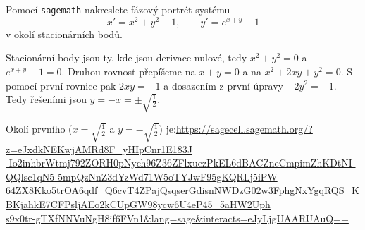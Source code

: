 \documentclass[12pt]{article}					%
\begin{document}
\begin{priklad}
	Pomocí \verb|sagemath| nakreslete fázový portrét systému
	$$ x' = x^2 + y^2 - 1, \qquad y' = e^{x + y} - 1 $$
	v okolí stacionárních bodů.

	\begin{reseni}
		Stacionární body jsou ty, kde jsou derivace nulové, tedy $x^2 + y^2 = 0$ a $e^{x + y} - 1 = 0$. Druhou rovnost přepíšeme na $x + y = 0$ a na $x^2 + 2xy + y^2 = 0$. S pomocí první rovnice pak $2xy = -1$ a dosazením z první úpravy $-2y^2 = -1$. Tedy řešeními jsou $y = -x = ±\sqrt{\frac{1}{2}}$.

		Okolí prvního ($x = \sqrt{\frac{1}{2}}$ a $y = -\sqrt{\frac{1}{2}}$) je:{\tiny \href{https://sagecell.sagemath.org/?z=eJxdkNEKwjAMRd8F_yHIpCnr1E183J-Io2inhbrWtmj792ZORH0pNych96Z36ZFlxuezPkEL6dBACZneCmpimZhKDtNI-QQlsc1qN5-5mpQzNnZ3dYzWd71W5oTYJwF95gKQRLj5iPW64ZX8Kko5trOA6qdf_Q6cvT4ZPajQsqserGdisnNWDzG02w3FphgNxYgqRQS_KBKjahkE7CFPsljAEo2kCUpGW98ycw6U4eP45_5aHW2Uphs9x0tr-gTXfNNVuNgH8if6FVn1&lang=sage&interacts=eJyLjgUAARUAuQ==}{https://sagecell.sagemath.org/?z=eJxdkNEKwjAMRd8F\_yHIpCnr1E183J}}\\
		{\tiny \href{https://sagecell.sagemath.org/?z=eJxdkNEKwjAMRd8F_yHIpCnr1E183J-Io2inhbrWtmj792ZORH0pNych96Z36ZFlxuezPkEL6dBACZneCmpimZhKDtNI-QQlsc1qN5-5mpQzNnZ3dYzWd71W5oTYJwF95gKQRLj5iPW64ZX8Kko5trOA6qdf_Q6cvT4ZPajQsqserGdisnNWDzG02w3FphgNxYgqRQS_KBKjahkE7CFPsljAEo2kCUpGW98ycw6U4eP45_5aHW2Uphs9x0tr-gTXfNNVuNgH8if6FVn1&lang=sage&interacts=eJyLjgUAARUAuQ==}{-Io2inhbrWtmj792ZORH0pNych96Z36ZFlxuezPkEL6dBACZneCmpimZhKDtNI-QQlsc1qN5-5mpQzNnZ3dYzWd71W5oTYJwF95gKQRLj5iPW}}\\
		{\tiny \href{https://sagecell.sagemath.org/?z=eJxdkNEKwjAMRd8F_yHIpCnr1E183J-Io2inhbrWtmj792ZORH0pNych96Z36ZFlxuezPkEL6dBACZneCmpimZhKDtNI-QQlsc1qN5-5mpQzNnZ3dYzWd71W5oTYJwF95gKQRLj5iPW64ZX8Kko5trOA6qdf_Q6cvT4ZPajQsqserGdisnNWDzG02w3FphgNxYgqRQS_KBKjahkE7CFPsljAEo2kCUpGW98ycw6U4eP45_5aHW2Uphs9x0tr-gTXfNNVuNgH8if6FVn1&lang=sage&interacts=eJyLjgUAARUAuQ==}{64ZX8Kko5trOA6qdf\_Q6cvT4ZPajQsqserGdisnNWDzG02w3FphgNxYgqRQS\_KBKjahkE7CFPsljAEo2kCUpGW98ycw6U4eP45\_5aHW2Uph}}\\
		{\tiny \href{https://sagecell.sagemath.org/?z=eJxdkNEKwjAMRd8F_yHIpCnr1E183J-Io2inhbrWtmj792ZORH0pNych96Z36ZFlxuezPkEL6dBACZneCmpimZhKDtNI-QQlsc1qN5-5mpQzNnZ3dYzWd71W5oTYJwF95gKQRLj5iPW64ZX8Kko5trOA6qdf_Q6cvT4ZPajQsqserGdisnNWDzG02w3FphgNxYgqRQS_KBKjahkE7CFPsljAEo2kCUpGW98ycw6U4eP45_5aHW2Uphs9x0tr-gTXfNNVuNgH8if6FVn1&lang=sage&interacts=eJyLjgUAARUAuQ==}{s9x0tr-gTXfNNVuNgH8if6FVn1\&lang=sage\&interacts=eJyLjgUAARUAuQ==}}\\[-2em]


\end{reseni}
\end{priklad}
\end{document}
